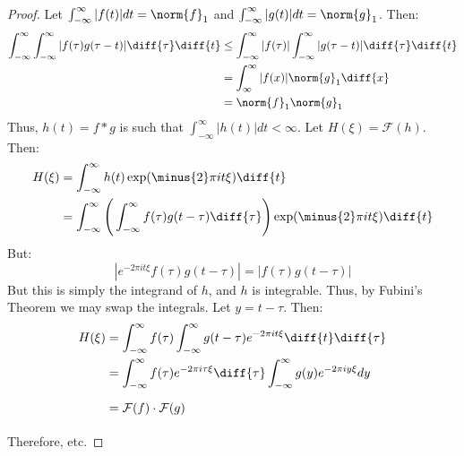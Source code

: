 \documentclass[crop=false,class=book,oneside]{standalone}
\begin{document}
            \begin{proof}
            Let $\int_{-\infty}^{\infty} |f(t)|dt = \norm{f}_{1}$ and $\int_{-\infty}^{\infty} |g(t)|dt = \norm{g}_{1}$. Then:
            \begin{align*}
                \int_{-\infty}^{\infty}\int_{-\infty}^{\infty}
                    |f(\tau)g(\tau-t)|\diff{\tau}\diff{t}
                &\leq\int_{-\infty}^{\infty}
                    |f(\tau)|\int_{-\infty}^{\infty}
                    |g(\tau-t)|\diff{\tau}\diff{t}\\
                &=\int_{\infty}^{\infty}
                    |f(x)|\norm{g}_{1}\diff{x}\\
                &=\norm{f}_{1}\norm{g}_{1}    
            \end{align*}
            Thus, $h(t)=f*g$ is such that
            $\int_{-\infty}^{\infty} |h(t)|dt < \infty$.
            Let $H(\xi) = \mathcal{F}(h)$. Then:
            \begin{align}
                H(\xi)&=
                    \int_{-\infty}^{\infty}
                    h(t)\exp(\minus{2}\pi{i}t\xi)\diff{t}\\
                &=\int_{-\infty}^{\infty}
                    \Bigg(
                        \int_{-\infty}^{\infty}
                        f(\tau)g(t-\tau)\diff{\tau}
                    \Bigg)\exp(\minus{2}\pi{i}t\xi)\diff{t}
            \end{align}
            But:
            \begin{equation}
                |e^{-2\pi{i}t\xi}f(\tau)g(t-\tau)|
                =|f(\tau)g(t-\tau)|
            \end{equation}
            But this is simply the integrand of $h$, and $h$
            is integrable. Thus, by Fubini's Theorem we may
            swap the integrals. Let $y=t-\tau$. Then:
            \begin{align}
                H(\xi)&=
                    \int_{-\infty}^{\infty}f(\tau)
                    \int_{-\infty}^{\infty}g(t-\tau)
                    e^{-2\pi{i}t\xi}\diff{t}\diff{\tau}\\
                &=\int_{-\infty}^{\infty}f(\tau)
                    e^{-2\pi{i}\tau\xi}\diff{\tau}
                    \int_{-\infty}^{\infty}g(y)
                    e^{-2\pi{i}y\xi}dy\\
                &=\mathcal{F}(f)\cdot\mathcal{F}(g)
                    \vphantom{\int_{-\infty}^{\infty}}
            \end{align}
            Therefore, etc.
            \end{proof}
\end{document}

